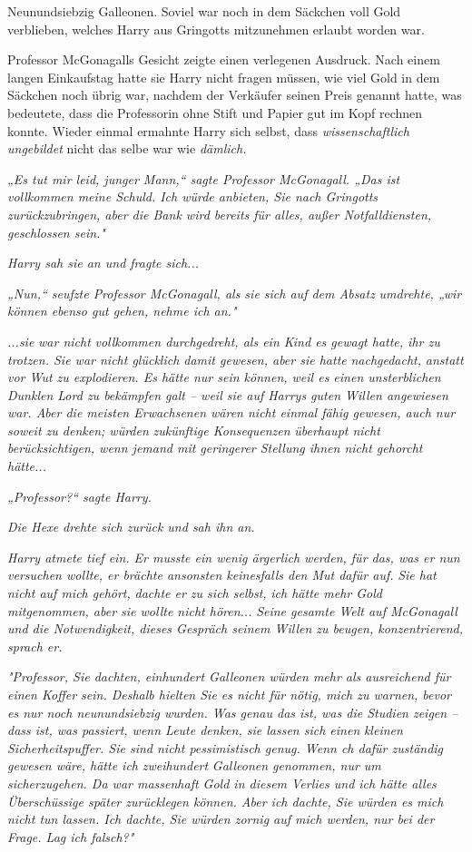{Neunundsiebzig Galleonen. Soviel war noch in dem Säckchen voll Gold verblieben, welches Harry aus Gringotts mitzunehmen erlaubt worden war.

Professor McGonagalls Gesicht zeigte einen verlegenen Ausdruck. Nach einem langen Einkaufstag hatte sie Harry nicht fragen müssen, wie viel Gold in dem Säckchen noch übrig war, nachdem der Verkäufer seinen Preis genannt hatte, was bedeutete, dass die Professorin ohne Stift und Papier gut im Kopf rechnen konnte. Wieder einmal ermahnte Harry sich selbst, dass \emph{wissenschaftlich ungebildet} nicht das selbe war wie \emph{dämlich.}

\emph{„Es tut mir leid, junger Mann,“ sagte Professor McGonagall. „Das ist vollkommen meine Schuld. Ich würde anbieten, Sie nach Gringotts zurückzubringen, aber die Bank wird bereits für alles, außer Notfalldiensten, geschlossen sein."}

\emph{Harry sah sie an und fragte sich...}

\emph{„Nun,“ seufzte Professor McGonagall, als sie sich auf dem Absatz} \emph{umdrehte, „wir können ebenso gut gehen, nehme ich an."}

\emph{...sie} \emph{\emph{war nicht}} \emph{vollkommen durchgedreht, als ein Kind es gewagt hatte, ihr zu trotzen. Sie war nicht glücklich damit gewesen, aber sie hatte} \emph{\emph{nachgedacht,}} \emph{anstatt vor Wut zu explodieren. Es hätte nur sein können, weil es einen unsterblichen Dunklen Lord zu bekämpfen galt -- weil sie auf Harrys guten Willen angewiesen war. Aber die meisten Erwachsenen wären nicht einmal fähig gewesen, auch nur soweit zu denken; würden} \emph{\emph{zukünftige Konsequenzen}} \emph{überhaupt nicht berücksichtigen, wenn jemand mit geringerer Stellung ihnen nicht gehorcht hätte...}

\emph{„Professor?“ sagte Harry.}

\emph{Die Hexe drehte sich zurück und sah ihn an.}

\emph{Harry atmete tief ein. Er musste ein wenig ärgerlich werden, für das, was er nun versuchen wollte, er brächte ansonsten keinesfalls den Mut dafür auf.} \emph{\emph{Sie hat nicht auf mich gehört,}} \emph{dachte er zu sich selbst,} \emph{\emph{ich hätte mehr Gold mitgenommen, aber sie wollte nicht hören...}} \emph{Seine gesamte Welt auf McGonagall und die Notwendigkeit, dieses Gespräch seinem Willen zu beugen, konzentrierend, sprach er.}

\emph{"Professor, Sie dachten, einhundert Galleonen würden mehr als ausreichend für einen Koffer sein. Deshalb hielten Sie es nicht für nötig, mich zu warnen, bevor es nur noch neunundsiebzig wurden. Was genau das ist, was die Studien zeigen -- dass ist, was passiert, wenn Leute denken, sie lassen sich einen} \emph{\emph{kleinen}} \emph{Sicherheitspuffer. Sie sind nicht pessimistisch genug. Wenn ch dafür zuständig gewesen wäre, hätte ich} \emph{\emph{zweihundert}} \emph{Galleonen genommen, nur um sicherzugehen. Da war massenhaft Gold in diesem Verlies und ich hätte alles Überschüssige später zurücklegen können. Aber ich dachte, Sie würden es mich nicht tun lassen. Ich dachte, Sie würden zornig auf mich werden, nur bei der Frage. Lag ich falsch?"}

}
